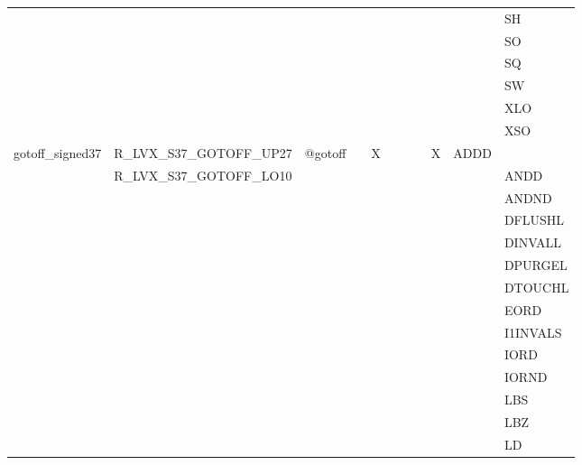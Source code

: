 {\begin{tabular}{|l|l|l|l|l|l|l|l|l|l|l|}
 & & & & & & & & & & \textsf{SH} \\
 & & & & & & & & & & \textsf{SO} \\
 & & & & & & & & & & \textsf{SQ} \\
 & & & & & & & & & & \textsf{SW} \\
 & & & & & & & & & & \textsf{XLO} \\
 & & & & & & & & & & \textsf{XSO} \\
\hline
\textsf{gotoff\_signed37} & \textsf{R\_LVX\_S37\_GOTOFF\_UP27} & \textsf{@gotoff} & \textsf{} & \textsf{X} & \textsf{} & \textsf{} & \textsf{} & \textsf{X} & \textsf{ADDD} \\
 & \textsf{R\_LVX\_S37\_GOTOFF\_LO10} & & & & & & & & & \textsf{ANDD} \\
 & & & & & & & & & & \textsf{ANDND} \\
 & & & & & & & & & & \textsf{DFLUSHL} \\
 & & & & & & & & & & \textsf{DINVALL} \\
 & & & & & & & & & & \textsf{DPURGEL} \\
 & & & & & & & & & & \textsf{DTOUCHL} \\
 & & & & & & & & & & \textsf{EORD} \\
 & & & & & & & & & & \textsf{I1INVALS} \\
 & & & & & & & & & & \textsf{IORD} \\
 & & & & & & & & & & \textsf{IORND} \\
 & & & & & & & & & & \textsf{LBS} \\
 & & & & & & & & & & \textsf{LBZ} \\
 & & & & & & & & & & \textsf{LD} \\
\hline\end{tabular}
}
\smallskip

